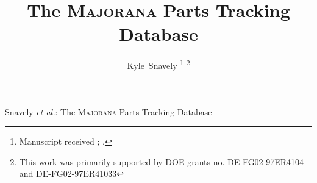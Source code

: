 \documentclass[journal]{IEEEtran}
\begin{document}
%
\title{The \textsc{Majorana} Parts Tracking Database}
%
%
%

\author{Kyle~Snavely
\thanks{Manuscript received ; .}
\thanks{This work was primarily supported by DOE grants no. DE-FG02-97ER4104 and DE-FG02-97ER41033}}

% 
%



%
{Snavely \MakeLowercase{\textit{et al.}}: The \textsc{Majorana} Parts Tracking Database}
% 
\end{document}
